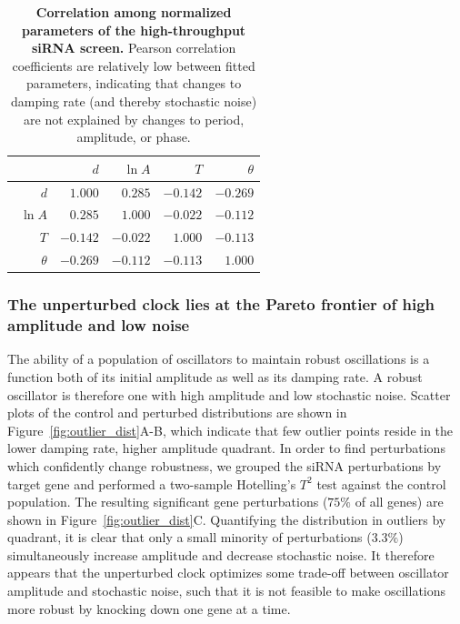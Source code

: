\documentclass[11pt, letterpaper]{article}
\begin{document}
\begin{table}
  \begin{center}
    \begin{tabular}{rrrrr}
      \toprule
      {}       & $d$    & $\ln A$ & $T$    & $\theta$ \\\midrule
      $d$      & $1.000 $ & $0.285 $  & $-0.142$ & $-0.269$\\\
      $\ln A$  & $0.285 $ & $1.000 $  & $-0.022$ & $-0.112$\\
      $T$      & $-0.142$ & $-0.022$  & $1.000 $ & $-0.113$\\
      $\theta$ & $-0.269$ & $-0.112$  & $-0.113$ & $1.000 $\\
      \bottomrule
    \end{tabular}
  \end{center}
  \caption{{\bfseries Correlation among normalized parameters of the high-throughput siRNA screen.} Pearson correlation coefficients are relatively low between fitted parameters, indicating that changes to damping rate (and thereby stochastic noise) are not explained by changes to period, amplitude, or phase.}
  \label{tab:corr}
\end{table}


\subsubsection*{The unperturbed clock lies at the Pareto frontier of high amplitude and low noise}

The ability of a population of oscillators to maintain robust oscillations is a function both of its initial amplitude as well as its damping rate.
A robust oscillator is therefore one with high amplitude and low stochastic noise.
Scatter plots of the control and perturbed distributions are shown in Figure~\ref{fig:outlier_dist}A-B, which indicate that few outlier points reside in the lower damping rate, higher amplitude quadrant.
In order to find perturbations which confidently change robustness, we grouped the siRNA perturbations by target gene and performed a two-sample Hotelling's $T^2$ test against the control population.
The resulting significant gene perturbations ($75\%$ of all genes) are shown in Figure~\ref{fig:outlier_dist}C.
Quantifying the distribution in outliers by quadrant, it is clear that only a small minority of perturbations ($3.3\%$) simultaneously increase amplitude and decrease stochastic noise.
It therefore appears that the unperturbed clock optimizes some trade-off between oscillator amplitude and stochastic noise, such that it is not feasible to make oscillations more robust by knocking down one gene at a time.
\end{document}
